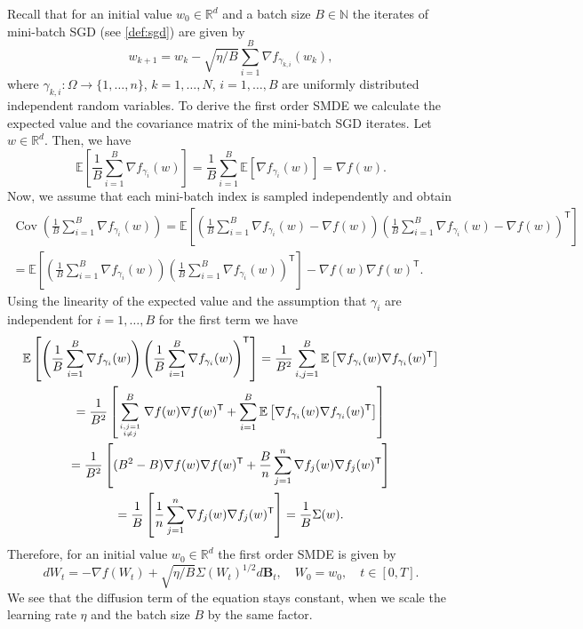 \documentclass[12pt]{article}
\theoremstyle{definition}
\numberwithin{equation}{section}
\newcommand{\N}{\mathbb{N}}
\newcommand{\R}{\mathbb{R}}
\newcommand{\T}{\mathsf{T}}
\newcommand{\ev}[1]{\mathbb{E}\left[{#1}\right]}
\DeclareMathOperator{\Cov}{Cov}
\begin{document}
Recall that for an initial value $w_0 \in \R^d$ and a batch size $B \in \N$ the iterates of mini-batch SGD (see \autoref{def:sgd}) are given by
\begin{equation*}
  w_{k+1} = w_k - \sqrt{\eta/B} \sum_{i=1}^B \nabla f_{\gamma_{k, i}}(w_k),
\end{equation*}
where $\gamma_{k,i} : \Omega \rightarrow \{1,\dots,n\}$, $k = 1,\dots,N$, $i =1, \dots, B$ are uniformly distributed independent random variables. To derive the first order SMDE we calculate the expected value and the covariance matrix of the mini-batch SGD iterates.
Let $w \in \R^d$. Then, we have
\begin{equation*}
  \ev{\frac{1}{B}\sum_{i=1}^B \nabla f_{\gamma_i}(w)}= \frac{1}{B}\sum_{i=1}^B \ev{\nabla f_{\gamma_i}(w)} = \nabla f(w).
\end{equation*}
Now, we assume that each mini-batch index is sampled independently and obtain  
\begin{multline*}
  \Cov\left(\frac{1}{B}\sum_{i=1}^B \nabla f_{\gamma_i}(w)\right) = \ev{\left(\frac{1}{B}\sum_{i=1}^B \nabla f_{\gamma_i}(w) - \nabla f(w)\right)\left(\frac{1}{B}\sum_{i=1}^B \nabla f_{\gamma_i}(w) - \nabla f(w)\right)^\T} \\
  = \ev{\left(\frac{1}{B}\sum_{i=1}^B \nabla f_{\gamma_i}(w)\right)\left(\frac{1}{B}\sum_{i=1}^B \nabla f_{\gamma_i}(w)\right)^\T} - \nabla f(w) \nabla f(w)^\T.
\end{multline*}
Using the linearity of the expected value and the assumption that $\gamma_i$ are independent for $i=1,\dots,B$ for the first term we have
\begin{multline*}
  \ev{\left(\frac{1}{B}\sum_{i=1}^B \nabla f_{\gamma_i}(w)\right)\left(\frac{1}{B}\sum_{i=1}^B \nabla f_{\gamma_i}(w)\right)^\T} = \frac{1}{B^2}\sum_{i,j=1}^B \ev{\nabla f_{\gamma_i}(w)\nabla f_{\gamma_i}(w)^\T} \\
  = \frac{1}{B^2}\left[\sum_{i,j=1 \atop i\neq j}^B\nabla f(w)\nabla f(w)^\T + \sum_{i=1}^B\ev{\nabla f_{\gamma_i}(w)\nabla f_{\gamma_i}(w)^\T}\right]\\
   = \frac{1}{B^2}\left[(B^2-B)\nabla f(w)\nabla f(w)^\T+\frac{B}{n}\sum_{j=1}^n\nabla f_j(w) \nabla f_j(w)^\T\right] \\
  = \frac{1}{B}\left[\frac{1}{n}\sum_{j=1}^n \nabla f_j(w) \nabla f_j(w)^\T\right] = \frac{1}{B}\Sigma(w).
\end{multline*}
Therefore, for an initial value $w_0 \in \R^d$ the first order SMDE is given by
\begin{equation*}
  dW_t = -\nabla f(W_t) + \sqrt{\eta/B}\Sigma(W_t)^{1/2}d\mathbf{B}_t, \quad W_0 = w_0, \quad t \in [0,T].
\end{equation*}
We see that the diffusion term of the equation stays constant, when we scale the learning rate $\eta$ and the batch size $B$ by the same factor.
\end{document}
